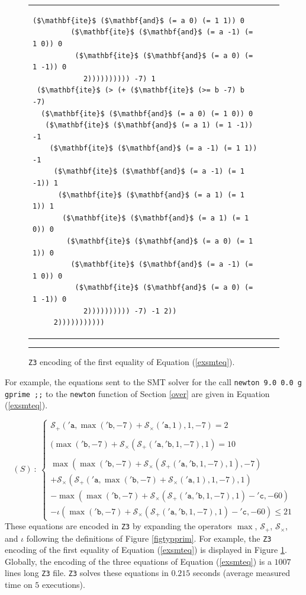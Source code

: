 \begin{figure}[t]
\begin{center}
\begin{tabular}{lll}
\begin{lstlisting}[mathescape]
        ($\mathbf{ite}$ ($\mathbf{and}$ (= a 0) (= 1 1)) 0
         ($\mathbf{ite}$ ($\mathbf{and}$ (= a -1) (= 1 0)) 0 
          ($\mathbf{ite}$ ($\mathbf{and}$ (= a 0) (= 1 -1)) 0
            2)))))))))) -7) 1 
 ($\mathbf{ite}$ (> (+ ($\mathbf{ite}$ (>= b -7) b -7) 
  ($\mathbf{ite}$ ($\mathbf{and}$ (= a 0) (= 1 0)) 0 
   ($\mathbf{ite}$ ($\mathbf{and}$ (= a 1) (= 1 -1)) -1 
    ($\mathbf{ite}$ ($\mathbf{and}$ (= a -1) (= 1 1)) -1 
     ($\mathbf{ite}$ ($\mathbf{and}$ (= a -1) (= 1 -1)) 1 
      ($\mathbf{ite}$ ($\mathbf{and}$ (= a 1) (= 1 1)) 1 
       ($\mathbf{ite}$ ($\mathbf{and}$ (= a 1) (= 1 0)) 0 
        ($\mathbf{ite}$ ($\mathbf{and}$ (= a 0) (= 1 1)) 0
         ($\mathbf{ite}$ ($\mathbf{and}$ (= a -1) (= 1 0)) 0 
          ($\mathbf{ite}$ ($\mathbf{and}$ (= a 0) (= 1 -1)) 0
            2)))))))))) -7) -1 2))
     2)))))))))))
\end{lstlisting}
\end{tabular}
\vspace{0.2cm}
\hrule
\end{center}
\caption{\label{figz3}\texttt{Z3} encoding of the first equality of Equation (\ref{exsmteq}).}
\end{figure}

For example, the equations sent to the SMT solver for 
the call \texttt{newton 9.0 0.0 g gprime ;;} to 
the  \texttt{newton} function
of Section \ref{over} are given in Equation (\ref{exsmteq}).

\begin{equation}\label{exsmteq}
(S)\ :\ \left\{
\begin{array}{l}

\mathcal{S}_+( \mathtt{'a}, \max( \mathtt{'b}, -7) + \mathcal{S}_\times( \mathtt{'a}, 1), 1, -7)=2\\
\ \\
(\max (\mathtt{'b}, -7) + \mathcal{S}_\times (\mathcal{S}_+ (\mathtt{'a}, \mathtt{'b}, 1, -7), 1)=10\\
\ \\
\max (\max( \mathtt{'b}, -7) + \mathcal{S}_\times (\mathcal{S}_+ (\mathtt{'a}, \mathtt{'b}, 1, -7), 1), -7) \\
+ 
\mathcal{S}_\times (\mathcal{S}_+ (\mathtt{'a}, \max (\mathtt{'b}, -7) + \mathcal{S}_\times( \mathtt{'a}, 1), 1, -7), 1)\\ 
- \max (\max( \mathtt{'b}, -7) + \mathcal{S}_\times (\mathcal{S}_+(\mathtt{'a}, \mathtt{'b}, 1, -7), 1) - \mathtt{'c}, -60)\\ 
- \iota (\max (\mathtt{'b}, -7) + \mathcal{S}_\times (\mathcal{S}_+( \mathtt{'a}, \mathtt{'b}, 1, -7) ,1) - \mathtt{'c} ,-60)
\le 21
\end{array}\right.
\end{equation}
These equations are encoded in \texttt{Z3} by expanding the operators $\max$, $\mathcal{S}_+$,
$\mathcal{S}_\times$, and $\iota$ following the definitions of Figure \ref{figtypprim}.
For example, the \texttt{Z3} encoding of the first equality of
Equation (\ref{exsmteq}) is displayed in Figure \ref{figz3}. Globally, the encoding of the three
equations of Equation (\ref{exsmteq}) is a $1007$ lines long \texttt{Z3} file.
\texttt{Z3} solves these equations in $0.215$ seconds (average measured time on $5$ executions).
